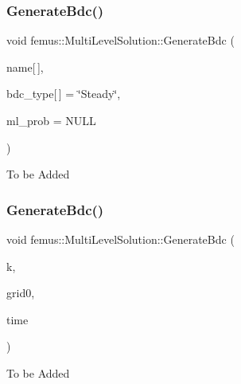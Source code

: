 \subsubsection{\texorpdfstring{Generate\+Bdc()}{GenerateBdc()}\hspace{0.1cm}{\footnotesize\ttfamily [1/2]}}
{\footnotesize\ttfamily void femus\+::\+Multi\+Level\+Solution\+::\+Generate\+Bdc (\begin{DoxyParamCaption}\item[{const char}]{name\mbox{[}$\,$\mbox{]},  }\item[{const char}]{bdc\+\_\+type\mbox{[}$\,$\mbox{]} = {\ttfamily \char`\"{}Steady\char`\"{}},  }\item[{const \mbox{\hyperlink{classfemus_1_1_multi_level_problem}{Multi\+Level\+Problem}} $\ast$}]{ml\+\_\+prob = {\ttfamily NULL} }\end{DoxyParamCaption})}

To be Added \mbox{\label{classfemus_1_1_multi_level_solution_a7ea9a2163b506be744fea42550e4e26e}} 
\subsubsection{\texorpdfstring{Generate\+Bdc()}{GenerateBdc()}\hspace{0.1cm}{\footnotesize\ttfamily [2/2]}}
{\footnotesize\ttfamily void femus\+::\+Multi\+Level\+Solution\+::\+Generate\+Bdc (\begin{DoxyParamCaption}\item[{const unsigned int}]{k,  }\item[{const unsigned}]{grid0,  }\item[{const double}]{time }\end{DoxyParamCaption})}

To be Added \mbox{\label{classfemus_1_1_multi_level_solution_a6a772d621d92076dfe0e37e376a421b0}} 
